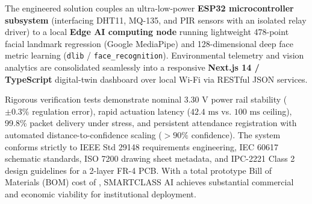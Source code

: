 \documentclass[11pt,a4paper]{article}
\begin{document}
The engineered solution couples an ultra-low-power \textbf{ESP32 microcontroller subsystem} (interfacing DHT11, MQ-135, and PIR sensors with an isolated relay driver) to a local \textbf{Edge AI computing node} running lightweight 478-point facial landmark regression (Google MediaPipe) and 128-dimensional deep face metric learning (\texttt{dlib} / \texttt{face\_recognition}). Environmental telemetry and vision analytics are consolidated seamlessly into a responsive \textbf{Next.js 14 / TypeScript} digital-twin dashboard over local Wi-Fi via RESTful JSON services.

Rigorous verification tests demonstrate nominal 3.30 V power rail stability ($\pm 0.3\%$ regulation error), rapid actuation latency ($42.4\text{ ms}$ vs. $100\text{ ms}$ ceiling), 99.8\% packet delivery under stress, and persistent attendance registration with automated distance-to-confidence scaling ($>90\%$ confidence). The system conforms strictly to IEEE Std 29148 requirements engineering, IEC 60617 schematic standards, ISO 7200 drawing sheet metadata, and IPC-2221 Class 2 design guidelines for a 2-layer FR-4 PCB. With a total prototype Bill of Materials (BOM) cost of , SMARTCLASS AI achieves substantial commercial and economic viability for institutional deployment.

\vspace{0.8cm}
\end{document}
